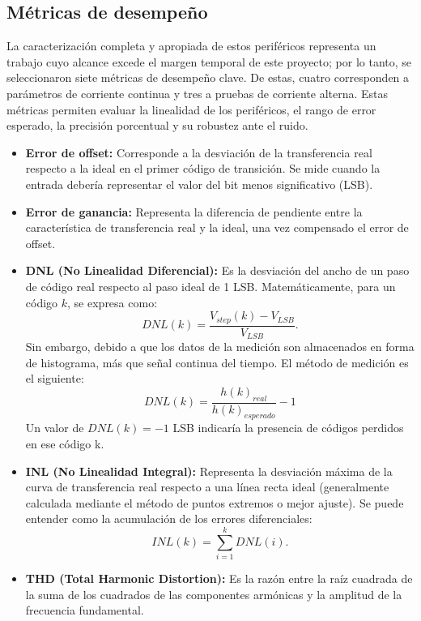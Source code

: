 \documentclass{article}
\begin{document}
\subsection{Métricas de desempeño}
La caracterización completa y apropiada de estos periféricos representa un trabajo cuyo alcance excede el margen temporal de este proyecto; por lo tanto, se seleccionaron siete métricas de desempeño clave. De estas, cuatro corresponden a parámetros de corriente continua y tres a pruebas de corriente alterna. Estas métricas permiten evaluar la linealidad de los periféricos, el rango de error esperado, la precisión porcentual y su robustez ante el ruido.
\begin{itemize}
    \item \textbf{Error de offset:} Corresponde a la desviación de la transferencia real respecto a la ideal en el primer código de transición. Se mide cuando la entrada debería representar el valor del bit menos significativo (LSB).
    \item \textbf{Error de ganancia:} Representa la diferencia de pendiente entre la característica de transferencia real y la ideal, una vez compensado el error de offset.
    \item \textbf{DNL (No Linealidad Diferencial):} Es la desviación del ancho de un paso de código real respecto al paso ideal de 1 LSB. Matemáticamente, para un código $k$, se expresa como:
    \begin{equation}
        DNL(k) = \frac{V_{step}(k) - V_{LSB}}{V_{LSB}}.
    \end{equation}
    Sin embargo, debido a que los datos de la medición son almacenados en forma de histograma, más que señal continua del tiempo. El método de medición es el siguiente:
    \begin{equation}
    	DNL(k) = \frac{h(k)_{real}}{h(k)_{esperado}}-1
    \end{equation}
    Un valor de $DNL(k) = -1$ LSB indicaría la presencia de códigos perdidos en ese código k.
    \item \textbf{INL (No Linealidad Integral):} Representa la desviación máxima de la curva de transferencia real respecto a una línea recta ideal (generalmente calculada mediante el método de puntos extremos o mejor ajuste). Se puede entender como la acumulación de los errores diferenciales:
    \begin{equation}
        INL(k) = \sum_{i=1}^{k} DNL(i).
    \end{equation}
    \item \textbf{THD (Total Harmonic Distortion):} Es la razón entre la raíz cuadrada de la suma de los cuadrados de las componentes armónicas y la amplitud de la frecuencia fundamental.

\end{itemize}
\end{document}
